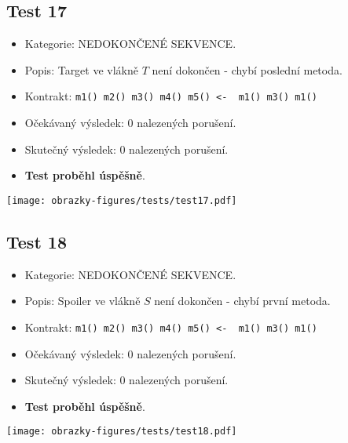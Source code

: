 \subsection*{Test 17}
\begin{itemize}
\item Kategorie: NEDOKONČENÉ SEKVENCE.
\item Popis: Target ve vlákně $T$ není dokončen - chybí poslední metoda.
\item Kontrakt: \texttt{m1() m2() m3() m4() m5() <- { m1() m3() m1()}}
\item Očekávaný výsledek: 0 nalezených porušení.
\item Skutečný výsledek: 0 nalezených porušení.

\item \textbf{Test proběhl úspěšně}.
\end{itemize}
\begin{center}
    \centering
    \texttt{[image: obrazky-figures/tests/test17.pdf]}
    \label{test17}
\end{center}
\subsection*{Test 18}
\begin{itemize}
\item Kategorie: NEDOKONČENÉ SEKVENCE.
\item Popis: Spoiler ve vlákně $S$ není dokončen - chybí první metoda.
\item Kontrakt: \texttt{m1() m2() m3() m4() m5() <- { m1() m3() m1()}}
\item Očekávaný výsledek: 0 nalezených porušení.
\item Skutečný výsledek: 0 nalezených porušení.

\item \textbf{Test proběhl úspěšně}.
\end{itemize}
\begin{center}
    \centering
    \texttt{[image: obrazky-figures/tests/test18.pdf]}
    \label{test18}
\end{center}

